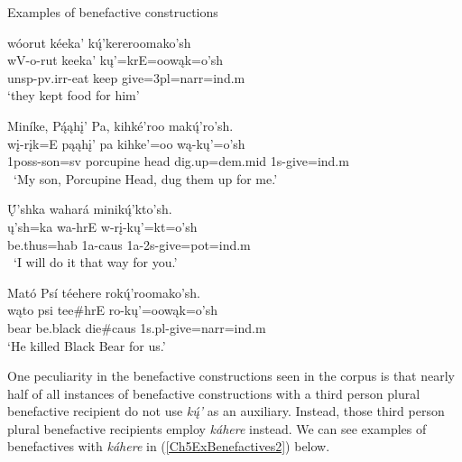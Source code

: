 \begin{exe}
    \item\label{Ch5ExBenefactives} Examples of benefactive constructions

    \begin{xlist}
        \item\label{Ch5ExBenefactivesA} \glll wóorut kéeka' kų́'kereroomako'sh\\
        wV-o-rut keeka' kų'=krE=oowąk=o'sh\\
        unsp-pv.irr-\textnormal{eat} \textnormal{keep} \textnormal{give}=3pl=narr=ind.m\\
        \glt `they kept food for him' \citep[109]{hollow1973a}

        \item\label{Ch5ExBenefactivesB} \glll Miníke, Pą́ąhį' Pa, kihké'roo makų́'ro'sh.\\
        wį-rįk=E pąąhį' pa kihke'=oo wą-kų'=o'sh\\
        1poss-\textnormal{son}=sv \textnormal{porcupine} \textnormal{head} \textnormal{dig.up}=dem.mid 1s-\textnormal{give}=ind.m\\\
        \glt `My son, Porcupine Head, dug them up for me.' \citep[55]{hollow1973a}

        \item\label{Ch5ExBenefactivesC} \glll Ų́'shka wahará minikų́'kto'sh.\\
        ų'sh=ka wa-hrE w-rį-kų'=kt=o'sh\\
        \textnormal{be.thus}=hab 1a-caus 1a-2s-\textnormal{give}=pot=ind.m\\\
        \glt `I will do it that way for you.' \citep[138]{hollow1973a}

        \item\label{Ch5ExBenefactivesD} \glll Mató Psí téehere rokų́'roomako'sh.\\
        wąto psi tee\#hrE ro-kų'=oowąk=o'sh\\
        \textnormal{bear} \textnormal{be.black} \textnormal{die}\#caus 1s.pl-\textnormal{give}=narr=ind.m\\
        \glt `He killed Black Bear for us.' \citep[160]{hollow1973b}
    \end{xlist}
\end{exe}

One peculiarity in the benefactive constructions seen in the corpus is that nearly half of all instances of benefactive constructions with a third person plural benefactive recipient do not use \textit{kų́'} as an auxiliary. Instead, those third person plural benefactive recipients employ \textit{káhere} instead. We can see examples of benefactives with \textit{káhere} in (\ref{Ch5ExBenefactives2}) below.

